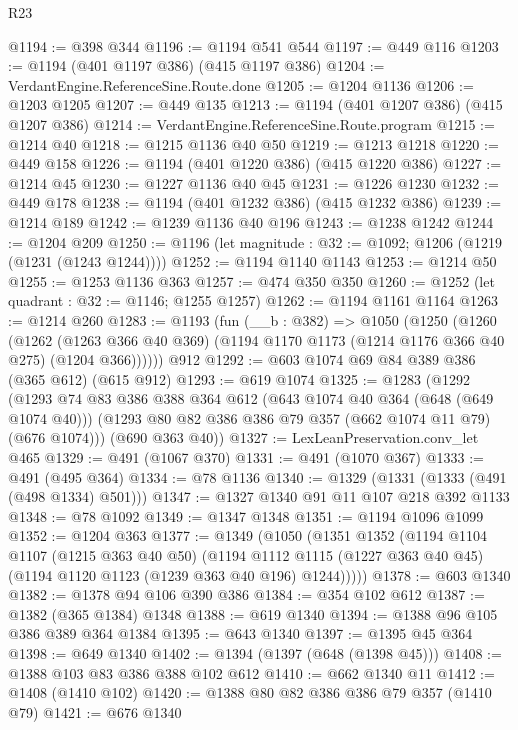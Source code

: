 \begin{lexlean}{R23}
\begin{coremodule}
@1194 := @398 @344
@1196 := @1194 @541 @544
@1197 := @449 @116
@1203 := @1194 (@401 @1197 @386) (@415 @1197 @386)
@1204 := VerdantEngine.ReferenceSine.Route.done
@1205 := @1204 @1136
@1206 := @1203 @1205
@1207 := @449 @135
@1213 := @1194 (@401 @1207 @386) (@415 @1207 @386)
@1214 := VerdantEngine.ReferenceSine.Route.program
@1215 := @1214 @40
@1218 := @1215 @1136 @40 @50
@1219 := @1213 @1218
@1220 := @449 @158
@1226 := @1194 (@401 @1220 @386) (@415 @1220 @386)
@1227 := @1214 @45
@1230 := @1227 @1136 @40 @45
@1231 := @1226 @1230
@1232 := @449 @178
@1238 := @1194 (@401 @1232 @386) (@415 @1232 @386)
@1239 := @1214 @189
@1242 := @1239 @1136 @40 @196
@1243 := @1238 @1242
@1244 := @1204 @209
@1250 := @1196 (let magnitude : @32 := @1092; @1206 (@1219 (@1231 (@1243 @1244))))
@1252 := @1194 @1140 @1143
@1253 := @1214 @50
@1255 := @1253 @1136 @363
@1257 := @474 @350 @350
@1260 := @1252 (let quadrant : @32 := @1146; @1255 @1257)
@1262 := @1194 @1161 @1164
@1263 := @1214 @260
@1283 := @1193
    (fun (__b : @382) =>
    @1050
      (@1250
        (@1260
          (@1262
            (@1263 @366 @40 @369)
            (@1194 @1170 @1173 (@1214 @1176 @366 @40 @275) (@1204 @366))))))
    @912
@1292 := @603 @1074 @69 @84 @389 @386 (@365 @612) (@615 @912)
@1293 := @619 @1074
@1325 := @1283
    (@1292
      (@1293
        @74
        @83
        @386
        @388
        @364
        @612
        (@643 @1074 @40 @364 (@648 (@649 @1074 @40)))
        (@1293 @80 @82 @386 @386 @79 @357 (@662 @1074 @11 @79) (@676 @1074)))
      (@690 @363 @40))
@1327 := LexLeanPreservation.conv_let @465
@1329 := @491 (@1067 @370)
@1331 := @491 (@1070 @367)
@1333 := @491 (@495 @364)
@1334 := @78 @1136
@1340 := @1329 (@1331 (@1333 (@491 (@498 @1334) @501)))
@1347 := @1327 @1340 @91 @11 @107 @218 @392 @1133
@1348 := @78 @1092
@1349 := @1347 @1348
@1351 := @1194 @1096 @1099
@1352 := @1204 @363
@1377 := @1349
    (@1050
      (@1351
        @1352
        (@1194
          @1104
          @1107
          (@1215 @363 @40 @50)
          (@1194
            @1112
            @1115
            (@1227 @363 @40 @45)
            (@1194 @1120 @1123 (@1239 @363 @40 @196) @1244)))))
@1378 := @603 @1340
@1382 := @1378 @94 @106 @390 @386
@1384 := @354 @102 @612
@1387 := @1382 (@365 @1384) @1348
@1388 := @619 @1340
@1394 := @1388 @96 @105 @386 @389 @364 @1384
@1395 := @643 @1340
@1397 := @1395 @45 @364
@1398 := @649 @1340
@1402 := @1394 (@1397 (@648 (@1398 @45)))
@1408 := @1388 @103 @83 @386 @388 @102 @612
@1410 := @662 @1340 @11
@1412 := @1408 (@1410 @102)
@1420 := @1388 @80 @82 @386 @386 @79 @357 (@1410 @79)
@1421 := @676 @1340

\end{coremodule}
\end{lexlean}
